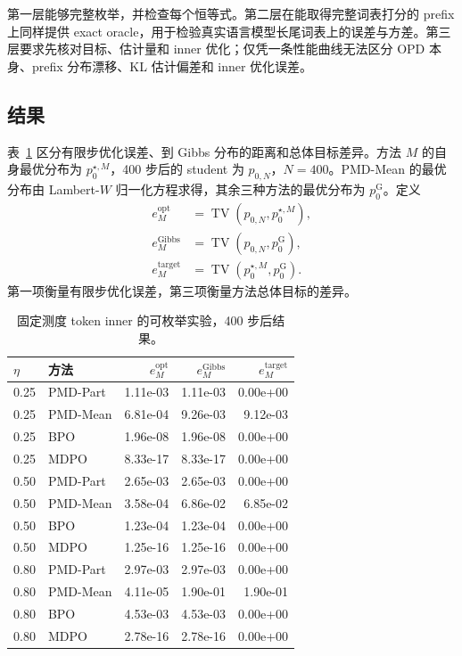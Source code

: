 \documentclass[lang=cn,scheme=chinese,openany]{../book/elegantbook}
\begin{document}
第一层能够完整枚举，并检查每个恒等式。第二层在能取得完整词表打分的 prefix 上同样提供 exact oracle，用于检验真实语言模型长尾词表上的误差与方差。第三层要求先核对目标、估计量和 inner 优化；仅凭一条性能曲线无法区分 OPD 本身、prefix 分布漂移、KL 估计偏差和 inner 优化误差。

\subsection{结果}

表~\ref{tab:toy-results} 区分有限步优化误差、到 Gibbs 分布的距离和总体目标差异。方法 $M$ 的自身最优分布为 $p_0^{\star,M}$，400 步后的 student 为 $p_{0,N}$，$N=400$。PMD-Mean 的最优分布由 Lambert-$W$ 归一化方程求得，其余三种方法的最优分布为 $p_0^{\mathrm G}$。定义
\begin{align*}
e^{\mathrm{opt}}_M&=\operatorname{TV}(p_{0,N},p_0^{\star,M}),\\
e^{\mathrm{Gibbs}}_M&=\operatorname{TV}(p_{0,N},p_0^{\mathrm G}),\\
e^{\mathrm{target}}_M&=\operatorname{TV}(p_0^{\star,M},p_0^{\mathrm G}).
\end{align*}
第一项衡量有限步优化误差，第三项衡量方法总体目标的差异。

\begin{table}[ht]
\centering
\caption{固定测度 token inner 的可枚举实验，400 步后结果。}
\label{tab:toy-results}
\begin{tabular}{llrrr}
\toprule
$\eta$ & 方法 & $e^{\mathrm{opt}}_M$ & $e^{\mathrm{Gibbs}}_M$ & $e^{\mathrm{target}}_M$\\
\midrule
0.25 & PMD-Part & 1.11e-03 & 1.11e-03 & 0.00e+00\\
0.25 & PMD-Mean & 6.81e-04 & 9.26e-03 & 9.12e-03\\
0.25 & BPO & 1.96e-08 & 1.96e-08 & 0.00e+00\\
0.25 & MDPO & 8.33e-17 & 8.33e-17 & 0.00e+00\\
0.50 & PMD-Part & 2.65e-03 & 2.65e-03 & 0.00e+00\\
0.50 & PMD-Mean & 3.58e-04 & 6.86e-02 & 6.85e-02\\
0.50 & BPO & 1.23e-04 & 1.23e-04 & 0.00e+00\\
0.50 & MDPO & 1.25e-16 & 1.25e-16 & 0.00e+00\\
0.80 & PMD-Part & 2.97e-03 & 2.97e-03 & 0.00e+00\\
0.80 & PMD-Mean & 4.11e-05 & 1.90e-01 & 1.90e-01\\
0.80 & BPO & 4.53e-03 & 4.53e-03 & 0.00e+00\\
0.80 & MDPO & 2.78e-16 & 2.78e-16 & 0.00e+00\\
\bottomrule
\end{tabular}
\end{table}
\end{document}
